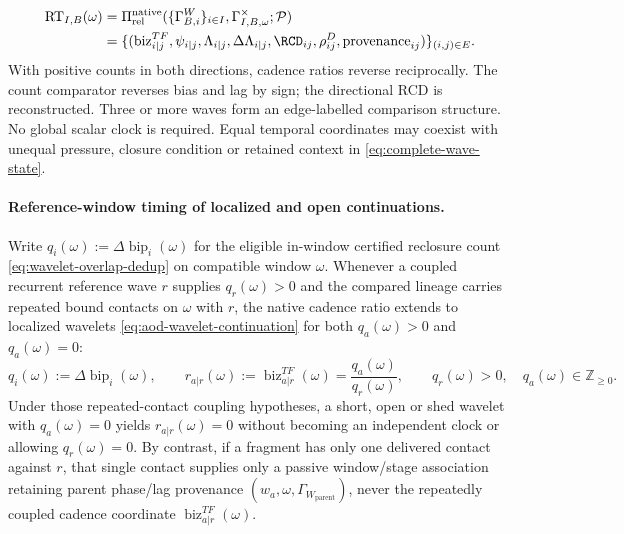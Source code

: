 \begin{equation}
\begin{split}
\operatorname{RT}_{I,B}(\omega)
&=\Pi^{\mathrm{native}}_{\mathrm{rel}}
(\{\Gamma^W_{B,i}\}_{i\in I},\Gamma^\times_{I,B,\omega};\mathcal P)\\
&=\{(\operatorname{biz}^{TF}_{i|j},\psi_{i|j},\Lambda_{i|j},
\Delta\Lambda_{i|j},\RCD_{ij},\rho^D_{ij},\mathrm{provenance}_{ij})\}_{(i,j)\in E}.
\end{split}
\label{eq:relational-time}
\end{equation}
With positive counts in both directions, cadence ratios reverse reciprocally.
The count comparator reverses bias and lag by sign; the directional RCD is
reconstructed. Three or more waves form an edge-labelled comparison structure.
No global scalar clock is required. Equal temporal coordinates may coexist
with unequal pressure, closure condition or retained context in
\eqref{eq:complete-wave-state}.

\paragraph{Reference-window timing of localized and open continuations.}
Write \(q_i(\omega):=\Delta\operatorname{bip}_i(\omega)\) for the eligible
in-window certified reclosure count \eqref{eq:wavelet-overlap-dedup} on
compatible window \(\omega\). Whenever a coupled recurrent reference wave \(r\)
supplies \(q_r(\omega)>0\) and the compared lineage carries repeated bound
contacts on \(\omega\) with \(r\), the native cadence ratio extends to
localized wavelets \eqref{eq:aod-wavelet-continuation} for both \(q_a(\omega)>0\)
and \(q_a(\omega)=0\):
\begin{equation}
q_i(\omega):=\Delta\operatorname{bip}_i(\omega),
\qquad
r_{a|r}(\omega):=\operatorname{biz}^{TF}_{a|r}(\omega)=\frac{q_a(\omega)}{q_r(\omega)},
\qquad
q_r(\omega)>0,\quad q_a(\omega)\in\mathbb Z_{\ge 0}.
\label{eq:wavelet-reference-timing}
\end{equation}
Under those repeated-contact coupling hypotheses, a short, open or shed wavelet
with \(q_a(\omega)=0\) yields \(r_{a|r}(\omega)=0\) without becoming an
independent clock or allowing \(q_r(\omega)=0\). By contrast, if a fragment
has only one delivered contact against \(r\), that single contact supplies only a
passive window/stage association retaining parent phase/lag provenance
\((w_a,\omega,\Gamma_{W_{\mathrm{parent}}})\), never the repeatedly coupled
cadence coordinate \(\operatorname{biz}^{TF}_{a|r}(\omega)\).

